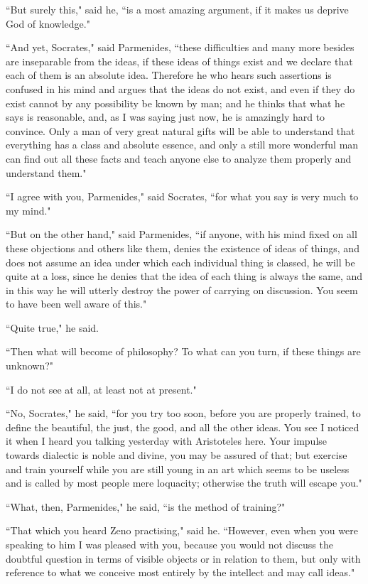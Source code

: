 \documentclass[letterpaper,12pt]{article}
\newcommand{\stephpag}[1]{\marginnote{\small\itshape\fontfamily{ppl}\selectfont #1}}
\begin{document}
``But surely this," said he, ``is a most amazing argument, if it makes us deprive God of knowledge."

``And yet, Socrates," said Parmenides, \stephpag{135 a} ``these difficulties and many more besides are inseparable from the ideas, if these ideas of things exist and we declare that each of them is an absolute idea. Therefore he who hears such assertions is confused in his mind and argues that the ideas do not exist, and even if they do exist cannot by any possibility be known by man; and he thinks that what he says is reasonable, and, as I was saying just now, he is amazingly hard to convince. Only a man of very great natural gifts will be able to understand that everything has a class and absolute essence, \stephpag{b} and only a still more wonderful man can find out all these facts and teach anyone else to analyze them properly and understand them."

``I agree with you, Parmenides," said Socrates, ``for what you say is very much to my mind."

``But on the other hand," said Parmenides, ``if anyone, with his mind fixed on all these objections and others like them, denies the existence of ideas of things, and does not assume an idea under which each individual thing is classed, he will be quite at a loss, \stephpag{c} since he denies that the idea of each thing is always the same, and in this way he will utterly destroy the power of carrying on discussion. You seem to have been well aware of this."

``Quite true," he said.

``Then what will become of philosophy? To what can you turn, if these things are unknown?"

``I do not see at all, at least not at present."

``No, Socrates," he said, ``for you try too soon, before you are properly trained, to define the beautiful, the just, the good, and all the other ideas. \stephpag{d} You see I noticed it when I heard you talking yesterday with Aristoteles here. Your impulse towards dialectic is noble and divine, you may be assured of that; but exercise and train yourself while you are still young in an art which seems to be useless and is called by most people mere loquacity; otherwise the truth will escape you."

``What, then, Parmenides," he said, ``is the method of training?"

``That which you heard Zeno practising," said he. \stephpag{e} ``However, even when you were speaking to him I was pleased with you, because you would not discuss the doubtful question in terms of visible objects or in relation to them, but only with reference to what we conceive most entirely by the intellect and may call ideas."
\end{document}
